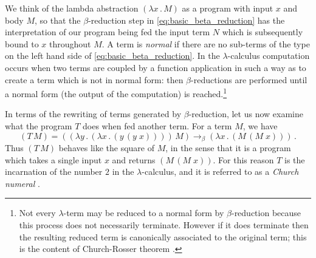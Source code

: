 \documentclass[english,letter paper,12pt,reqno]{article}
\theoremstyle{example}
\def\inta{\bold{int}}
\begin{document}
We think of the lambda abstraction $(\lambda x \,.\, M)$ as a program with input $x$ and body $M$, so that the $\beta$-reduction step in \eqref{eq:basic_beta_reduction} has the interpretation of our program being fed the input term $N$ which is subsequently bound to $x$ throughout $M$. A term is \emph{normal} if there are no sub-terms of the type on the left hand side of \eqref{eq:basic_beta_reduction}. In the $\lambda$-calculus computation occurs when two terms are coupled by a function application in such a way as to create a term which is not in normal form: then $\beta$-reductions are performed until a normal form (the output of the computation) is reached.\footnote{Not every $\lambda$-term may be reduced to a normal form by $\beta$-reduction because this process does not necessarily terminate. However if it does terminate then the resulting reduced term is canonically associated to the original term; this is the content of Church-Rosser theorem \cite[\S 4.2]{selinger}.}

In terms of the rewriting of terms generated by $\beta$-reduction, let us now examine what the program $T$ does when fed another term. For a term $M$, we have
\begin{equation}\label{eq:beta_reduc_dup}
(T \, M) = (( \lambda y \,.\, ( \lambda x \,.\, (y \,(y \; x))))\, M) \longrightarrow_\beta (\lambda x \, . \, (M \, (M \; x)))\,.
\end{equation}
Thus $(T \, M)$ behaves like the square of $M$, in the sense that it is a program which takes a single input $x$ and returns $(M \, (M \; x))$. For this reason $T$ is the incarnation of the number $2$ in the $\lambda$-calculus, and it is referred to as a \emph{Church numeral} \cite[\S 3.2]{selinger}.
\end{document}
